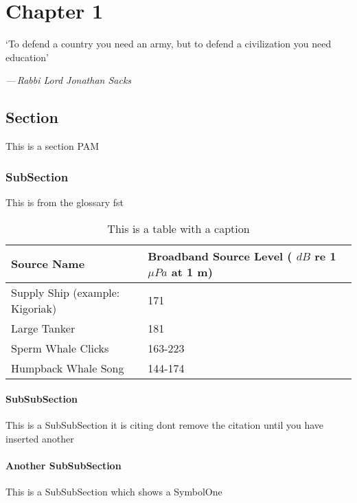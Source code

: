 \documentclass[class=report,11pt,crop=false]{standalone}
\begin{document}
\ifstandalone
    \tableofcontents
    \listoffigures
    \listoftables
    \printnoidxglossary[type=\acronymtype,,nonumberlist]
    \printnoidxglossary[type=Symbols,nonumberlist]
    \printnoidxglossary[type=Abbreviations,nonumberlist] %
\fi

\chapter{Chapter 1\label{ch:chapter1}}

\epigraph{`To defend a country you need an army, but to defend a civilization you need education'}%
{\emph{---\,Rabbi Lord Jonathan Sacks}}
\vspace{0.5cm}

\section{Section}

This is a section \gls{PAM}

\subsection{SubSection}

This is from the glossary \gls{fst}

\begin{table}[H]
    \label{table:DeepSeaNoise2006_acoustic_levels}
    \centering
    \begin{tabular}{l|l}
        Source Name                     & Broadband Source Level ( \( dB \) re 1 \(\mu Pa \) at 1 m) \\ \hline
        Supply Ship (example: Kigoriak) & 171                                                        \\
        Large Tanker                    & 181                                                        \\
        Sperm Whale Clicks              & 163-223                                                    \\
        Humpback Whale Song             & 144-174                                                    \\
    \end{tabular}
    \caption{This is a table with a caption}
\end{table}


\subsubsection{SubSubSection}

This is a SubSubSection it is citing dont remove the citation until you have inserted
another \cite{levanon2004radar}

\subsubsection{Another SubSubSection}

This is a SubSubSection which shows a \gls{SymbolOne}


\ifstandalone
    \printbibliography  %
\fi
\end{document}
